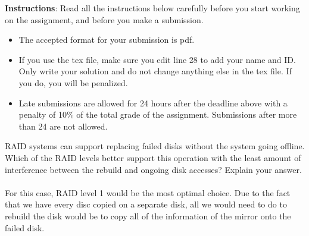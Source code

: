 \documentclass[a4 paper]{article}
\begin{document}
\textbf{Instructions}: Read all the instructions below carefully before you start working on the assignment, and before you make a submission.
\begin{itemize}
    \item The accepted format for your submission is pdf.
    \item If you use the tex file, make sure you edit line 28 to add your name and ID. Only write your solution and do not change anything else in the tex file. If you do, you will be penalized.
    \item Late submissions are allowed for 24 hours after the deadline above with a penalty of 10\% of the total grade of the assignment. Submissions after more than 24 are not allowed.
\end{itemize}

RAID systems can support replacing failed disks without the system going offline. Which of the RAID levels better support this operation with the least amount of interference between the rebuild and ongoing disk accesses? Explain your answer.\\\\

For this case, RAID level 1 would be the most optimal choice. Due to the fact that we have every disc copied on a separate disk, all we would need to do to rebuild the disk would be to copy all of the information of the mirror onto the failed disk.

%
%
\end{document}
